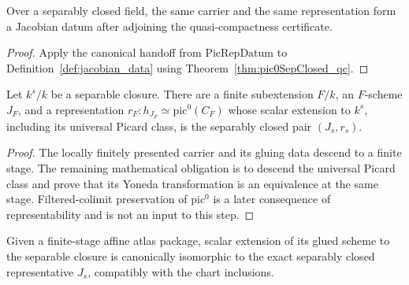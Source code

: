 \begin{theorem}
  \label{thm:pic0SepClosedDescentInput_exists}
  \leanok
  Over a separably closed field, the same carrier and the same representation form a Jacobian
  datum after adjoining the quasi-compactness certificate.
\end{theorem}
\begin{proof}
  \leanok
  Apply the canonical handoff from \(\mathrm{PicRepDatum}\) to
  Definition~\ref{def:jacobian_data} using Theorem~\ref{thm:pic0SepClosed_qc}.
\end{proof}

\begin{theorem}
  \label{thm:pic0DescentCompatibility}
  \notready
  Let \(k^s/k\) be a separable closure.  There are a finite subextension \(F/k\), an
  \(F\)-scheme \(J_F\), and a representation
  \(r_F:h_{J_F}\simeq\mathrm{pic}^0(C_F)\) whose scalar extension to \(k^s\), including its
  universal Picard class, is the separably closed pair \((J_s,r_s)\).
\end{theorem}
\begin{proof}
  The locally finitely presented carrier and its gluing data descend to a finite stage.  The
  remaining mathematical obligation is to descend the universal Picard class and prove that
  its Yoneda transformation is an equivalence at the same stage.  Filtered-colimit
  preservation of \(\mathrm{pic}^0\) is a later consequence of representability and is not an
  input to this step.
\end{proof}

\begin{definition}
  \label{def:pic0FiniteStageBaseChangeIso}
  Given a finite-stage affine atlas package, scalar extension of its glued scheme to the
  separable closure is canonically isomorphic to the exact separably closed representative
  \(J_s\), compatibly with the chart inclusions.
\end{definition}

